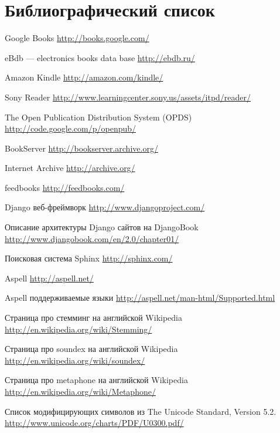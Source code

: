 \cleardoublepage
\section{Библиографический список}
 
\renewcommand*{\refname}{}
\begin{thebibliography}{99}

 Google Books \url{http://books.google.com/}

 eBdb --- electronics books data base \url{http://ebdb.ru/}

 Amazon Kindle \url{http://amazon.com/kindle/}

 Sony Reader \url{http://www.learningcenter.sony.us/assets/itpd/reader/}

 The Open Publication Distribution System (OPDS) \url{http://code.google.com/p/openpub/}

 BookServer \url{http://bookserver.archive.org/}

 Internet Archive \url{http://archive.org/}

 feedbooks \url{http://feedbooks.com/}

 Django веб-фреймворк \url{http://www.djangoproject.com/}

 Описание архитектуры Django сайтов на DjangoBook \url{http://www.djangobook.com/en/2.0/chapter01/}

 Поисковая система Sphinx \url{http://sphinx.com/}

 Aspell \url{http://aspell.net/}

 Aspell поддерживаемые языки \url{http://aspell.net/man-html/Supported.html}

 Страница про стемминг на английской Wikipedia \url{http://en.wikipedia.org/wiki/Stemming/}

 Страница про soundex на английской Wikipedia \url{http://en.wikipedia.org/wiki/soundex/}

 Страница про metaphone на английской Wikipedia \url{http://en.wikipedia.org/wiki/Metaphone/}

 Список модифицирующих символов из The Unicode Standard, Version 5.2.  \url{http://www.unicode.org/charts/PDF/U0300.pdf/}




\end{thebibliography}